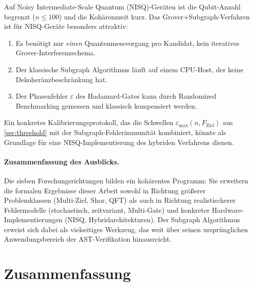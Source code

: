 ﻿\documentclass[11pt,a4paper]{article}
\theoremstyle{definition}
\begin{document}
Auf Noisy Intermediate-Scale Quantum (NISQ)-Geräten \cite{Preskill2018} ist
die Qubit-Anzahl begrenzt ($n \leq 100$) und die Kohärenzzeit kurz.
Das Grover+Subgraph-Verfahren ist für NISQ-Geräte besonders attraktiv:
\begin{enumerate}[label=(\alph*)]
  \item Es benötigt nur \emph{einen} Quantenmessvorgang pro Kandidat,
        kein iteratives Grover-Interferenz\-schema.
  \item Der klassische Subgraph Algorithmus läuft auf einem CPU-Host,
        der keine Dekoheränzbeschränkung hat.
  \item Der Phasenfehler $\varepsilon$ des Hadamard-Gates kann durch
        Randomized Benchmarking \cite{Magesan2011,Knill2008} gemessen und
        klassisch kompensiert werden.
\end{enumerate}
Ein konkretes Kalibrierungsprotokoll, das die Schwellen
$\varepsilon_{\max}(n, F_{\mathrm{Ziel}})$ aus \cref{sec:threshold} mit der
Subgraph-Fehlerimmunität kombiniert, könnte als Grundlage für eine
NISQ-Implementierung des hybriden Verfahrens dienen.

\paragraph{Zusammenfassung des Ausblicks.}
Die sieben Forschungsrichtungen bilden ein kohärentes Programm:
Sie erweitern die formalen Ergebnisse dieser Arbeit sowohl in Richtung
größerer Problemklassen (Multi-Ziel, Shor, QFT) als auch in Richtung
realistischerer Fehlermodelle (stochastisch, zeitvariant, Multi-Gate)
und konkreter Hardware-Implementierungen (NISQ, Hybridarchitekturen).
Der Subgraph Algorithmus \cite{Epp2026} erweist sich dabei als vielseitiges
Werkzeug, das weit über seinen ursprünglichen Anwendungsbereich der
AST-Verifikation hinausreicht.


\section{Zusammenfassung}
\label{sec:conclusion}
\end{document}
